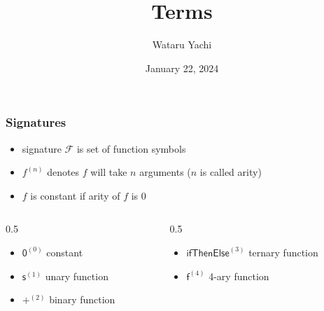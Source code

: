 \documentclass[12pt,aspectratio=169]{beamer}
\title{ Terms }
\author{Wataru Yachi}
\institute{JAIST}
\date{January 22, 2024}
\newcommand{\m}[1]{\mathsf{#1}}
\newcommand{\FF}{\mathcal{F}}
\newlength{\mytotalwidth}
\newlength{\mycolumnwidth}
\begin{document}
\maketitle

\begin{frame}
    \frametitle{Signatures}
    \begin{definition}
        \begin{itemize}
            \item \alert{signature} $\FF$ is set of function symbols
            \item \alert{$f^{(n)}$} denotes $f$ will take $n$ arguments ($n$ is called \alert{arity})
            \item $f$ is \alert{constant} if arity of $f$ is 0
        \end{itemize}
    \end{definition}
    
    \pause
    \begin{example}
        \begin{columns}[totalwidth=\mytotalwidth]
        \begin{column}[t]{0.5\mycolumnwidth}
            \begin{itemize}
                \pause
            \item $\mathsf{0}^{(0)}$ \quad \alert{constant}
                \pause
            \item $\m{s}^{(1)}$ \quad \alert{unary function}
                \pause
            \item $\m{+}^{(2)}$ \quad \alert{binary function}
            \end{itemize}
        \end{column}
        \begin{column}[t]{0.5\mycolumnwidth}
            \begin{itemize}
                \pause
            \item $\m{ifThenElse}^{(3)}$ \quad \alert{ternary function}
                \pause
            \item $\m{f}^{(4)}$ \quad \alert{4-ary function}
            \end{itemize}
        \end{column}
        \end{columns}
    \end{example}
\end{frame}
\end{document}
